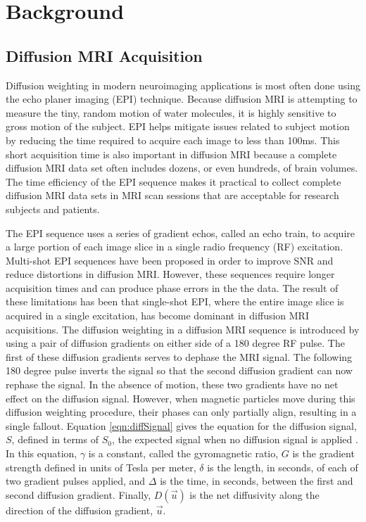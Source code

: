 \chapter{Background}
\section{Diffusion MRI Acquisition}
	Diffusion weighting in modern neuroimaging applications is most often done using the echo planer imaging (EPI) technique\cite{Poustchi_Amin_2001, Ordidge_1984}. Because diffusion MRI is attempting to measure the tiny, random motion of water molecules, it is highly sensitive to gross motion of the subject. EPI helps mitigate issues related to subject motion by reducing the time required to acquire each image to less than 100ms. This short acquisition time is also important in diffusion MRI because a complete diffusion MRI data set often includes dozens, or even hundreds, of brain volumes. The time efficiency of the EPI sequence makes it practical to collect complete diffusion MRI data sets in MRI scan sessions that are acceptable for research subjects and patients.
	
    The EPI sequence uses a series of gradient echos, called an echo train, to acquire a large portion of each image slice in a single radio frequency (RF) excitation. Multi-shot EPI sequences have been proposed in order to improve SNR and reduce distortions in diffusion MRI. However, these sequences require longer acquisition times and can produce phase errors in the the data\cite{Feinberg_1994}. The result of these limitations has been that single-shot EPI, where the entire image slice is acquired in a single excitation, has become dominant in diffusion MRI acquisitions. The diffusion weighting in a diffusion MRI sequence is introduced by using a pair of diffusion gradients on either side of a 180 degree RF pulse. The first of these diffusion gradients serves to dephase the MRI signal. The following 180 degree pulse inverts the signal so that the second diffusion gradient can now rephase the signal. In the absence of motion, these two gradients have no net effect on the diffusion signal. However, when magnetic particles move during this diffusion weighting procedure, their phases can only partially align, resulting in a single fallout. Equation \ref{eqn:diffSignal} gives the equation for the diffusion signal, $S$, defined in terms of $S_0$, the expected signal when no diffusion signal is applied \cite{2014}. In this equation, $\gamma$ is a constant, called the gyromagnetic ratio, $G$ is the gradient strength defined in units of Tesla per meter, $\delta$ is the length, in seconds, of each of two gradient pulses applied, and $\Delta$ is the time, in seconds, between the first and second diffusion gradient. Finally, $D(\vec{u})$ is the net diffusivity along the direction of the diffusion gradient, $\vec{u}$.

